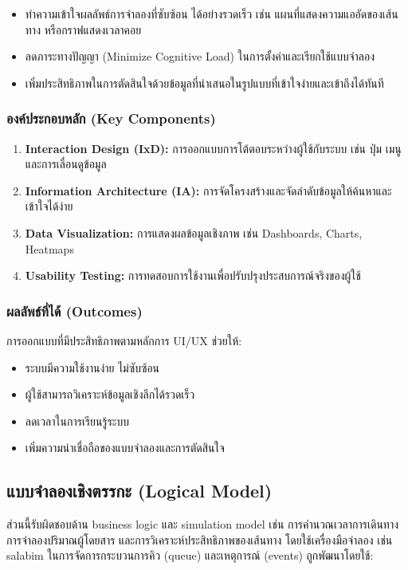 \begin{itemize}
    \item ทำความเข้าใจผลลัพธ์การจำลองที่ซับซ้อน ได้อย่างรวดเร็ว เช่น แผนที่แสดงความแออัดของเส้นทาง
    หรือกราฟแสดงเวลาคอย
    \item ลดภาระทางปัญญา (Minimize Cognitive Load) ในการตั้งค่าและเรียกใช้แบบจำลอง
    \item เพิ่มประสิทธิภาพในการตัดสินใจด้วยข้อมูลที่นำเสนอในรูปแบบที่เข้าใจง่ายและเข้าถึงได้ทันที
\end{itemize}

\subsubsection{\textbf{องค์ประกอบหลัก (Key Components)}}
\begin{enumerate}
    \item \textbf{Interaction Design (IxD):} การออกแบบการโต้ตอบระหว่างผู้ใช้กับระบบ เช่น ปุ่ม เมนู และการเลื่อนดูข้อมูล
    \item \textbf{Information Architecture (IA):} การจัดโครงสร้างและจัดลำดับข้อมูลให้ค้นหาและเข้าใจได้ง่าย
    \item \textbf{Data Visualization:} การแสดงผลข้อมูลเชิงภาพ เช่น Dashboards, Charts, Heatmaps
    \item \textbf{Usability Testing:} การทดสอบการใช้งานเพื่อปรับปรุงประสบการณ์จริงของผู้ใช้
\end{enumerate}

\subsubsection{\textbf{ผลลัพธ์ที่ได้ (Outcomes)}}
\begin{mypara}
    \indent การออกแบบที่มีประสิทธิภาพตามหลักการ UI/UX ช่วยให้:
\end{mypara}
\begin{itemize}
    \item ระบบมีความใช้งานง่าย ไม่ซับซ้อน
    \item ผู้ใช้สามารถวิเคราะห์ข้อมูลเชิงลึกได้รวดเร็ว
    \item ลดเวลาในการเรียนรู้ระบบ
    \item เพิ่มความน่าเชื่อถือของแบบจำลองและการตัดสินใจ
\end{itemize}


\subsection{แบบจำลองเชิงตรรกะ (Logical Model)}
  ส่วนนี้รับผิดชอบด้าน business logic และ simulation model
  เช่น การคำนวณเวลาการเดินทาง การจำลองปริมาณผู้โดยสาร 
  และการวิเคราะห์ประสิทธิภาพของเส้นทาง โดยใช้เครื่องมือจำลอง 
  เช่น salabim ในการจัดการกระบวนการคิว (queue) และเหตุการณ์ (events) ถูกพัฒนาโดยใช้:
